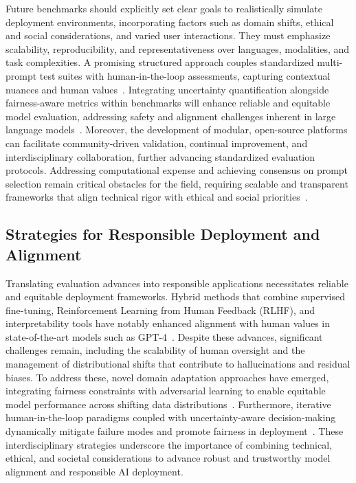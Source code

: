 \documentclass[sigconf]{acmart}
\begin{document}
Future benchmarks should explicitly set clear goals to realistically simulate deployment environments, incorporating factors such as domain shifts, ethical and social considerations, and varied user interactions. They must emphasize scalability, reproducibility, and representativeness over languages, modalities, and task complexities. A promising structured approach couples standardized multi-prompt test suites with human-in-the-loop assessments, capturing contextual nuances and human values~\cite{ref11,ref20,ref21}. Integrating uncertainty quantification alongside fairness-aware metrics within benchmarks will enhance reliable and equitable model evaluation, addressing safety and alignment challenges inherent in large language models~\cite{ref11,ref35,ref41}. Moreover, the development of modular, open-source platforms can facilitate community-driven validation, continual improvement, and interdisciplinary collaboration, further advancing standardized evaluation protocols. Addressing computational expense and achieving consensus on prompt selection remain critical obstacles for the field, requiring scalable and transparent frameworks that align technical rigor with ethical and social priorities~\cite{ref20,ref21}.

\subsection{Strategies for Responsible Deployment and Alignment}

Translating evaluation advances into responsible applications necessitates reliable and equitable deployment frameworks. Hybrid methods that combine supervised fine-tuning, Reinforcement Learning from Human Feedback (RLHF), and interpretability tools have notably enhanced alignment with human values in state-of-the-art models such as GPT-4~\cite{ref20,ref11}. Despite these advances, significant challenges remain, including the scalability of human oversight and the management of distributional shifts that contribute to hallucinations and residual biases. To address these, novel domain adaptation approaches have emerged, integrating fairness constraints with adversarial learning to enable equitable model performance across shifting data distributions~\cite{ref41}. Furthermore, iterative human-in-the-loop paradigms coupled with uncertainty-aware decision-making dynamically mitigate failure modes and promote fairness in deployment~\cite{ref31,ref35}. These interdisciplinary strategies underscore the importance of combining technical, ethical, and societal considerations to advance robust and trustworthy model alignment and responsible AI deployment.
\end{document}

